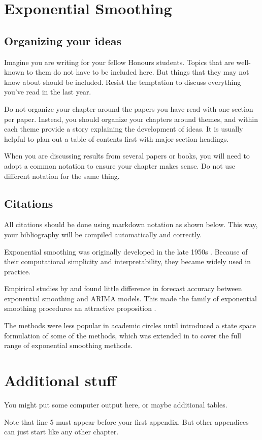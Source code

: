\documentclass{monashthesis}
\begin{document}
\chapter{Exponential Smoothing}\label{sec:expsmooth}

\section{Organizing your ideas}\label{organizing-your-ideas}

Imagine you are writing for your fellow Honours students. Topics that
are well-known to them do not have to be included here. But things that
they may not know about should be included. Resist the temptation to
discuss everything you've read in the last year.

Do not organize your chapter around the papers you have read with one
section per paper. Instead, you should organize your chapters around
themes, and within each theme provide a story explaining the development
of ideas. It is usually helpful to plan out a table of contents first
with major section headings.

When you are discussing results from several papers or books, you will
need to adopt a common notation to ensure your chapter makes sense. Do
not use different notation for the same thing.

\section{Citations}\label{citations}

All citations should be done using markdown notation as shown below.
This way, your bibliography will be compiled automatically and
correctly.

Exponential smoothing was originally developed in the late 1950s
\autocites{Brown59}{Brown63}{Holt57}{Winters60}. Because of their
computational simplicity and interpretability, they became widely used
in practice.

Empirical studies by \textcite{MH79} and \textcite{Metal82} found little
difference in forecast accuracy between exponential smoothing and ARIMA
models. This made the family of exponential smoothing procedures an
attractive proposition \autocite[see][]{CKOS01}.

The methods were less popular in academic circles until \textcite{OKS97}
introduced a state space formulation of some of the methods, which was
extended in \textcite{HKSG02} to cover the full range of exponential
smoothing methods.

\appendix

\chapter{Additional stuff}\label{additional-stuff}

You might put some computer output here, or maybe additional tables.

Note that line 5 must appear before your first appendix. But other
appendices can just start like any other chapter.

\printbibliography[heading=bibintoc]
\end{document}
